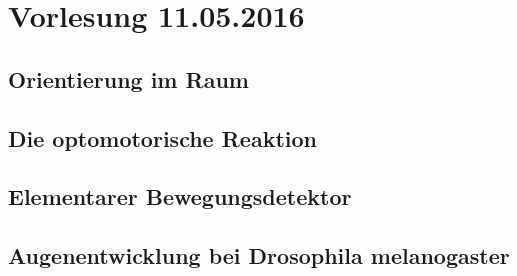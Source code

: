 \section{Vorlesung 11.05.2016}

\subsection{Orientierung im Raum}

\subsection{Die optomotorische Reaktion}

\subsection{Elementarer Bewegungsdetektor}

\subsection{Augenentwicklung bei Drosophila melanogaster}